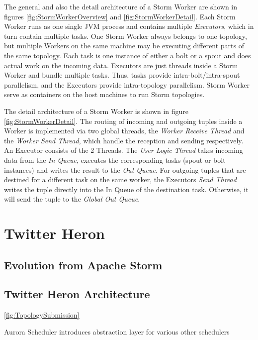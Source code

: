 \documentclass[conference]{IEEEtran}
\begin{document}
The general and also the detail architecture of a Storm Worker are shown in figures \ref{fig:StormWorkerOverview} and \ref{fig:StormWorkerDetail}.
Each Storm Worker runs as one single JVM process and contains multiple \emph{Executors}, which in turn contain multiple tasks.
One Storm Worker always belongs to one topology, but multiple Workers on the same machine may be executing different parts of the same topology.
Each task is one instance of either a bolt or a spout and does actual work on the incoming data.
Executors are just threads inside a Storm Worker and bundle multiple tasks.
Thus, tasks provide intra-bolt/intra-spout parallelism, and the Executors provide intra-topology parallelism.
Storm Worker serve as containers on the host machines to run Storm topologies.

The detail architecture of a Storm Worker is shown in figure \ref{fig:StormWorkerDetail}.
The routing of incoming and outgoing tuples inside a Worker is implemented via two global threads, the \emph{Worker Receive Thread} and the \emph{Worker Send Thread}, which handle the reception and sending respectively.
An Executor consists of the 2 Threads.
The \emph{User Logic Thread} takes incoming data from the \emph{In Queue}, executes the corresponding tasks (spout or bolt instances) and writes the result to the \emph{Out Queue}.
For outgoing tuples that are destined for a different task on the same worker, the Executors \emph{Send Thread} writes the tuple directly into the In Queue of the destination task.
Otherwise, it will send the tuple to the \emph{Global Out Queue}.

\section{Twitter Heron}
\label{sec:TwitterHeron}

\subsection{Evolution from Apache Storm}
\label{sec:EvolutionFromApacheStorm}

\subsection{Twitter Heron Architecture}
\label{sec:TwitterHeronArchitecture}

\ref{fig:TopologySubmission}

Aurora Scheduler introduces abstraction layer for 
various other schedulers
\end{document}
